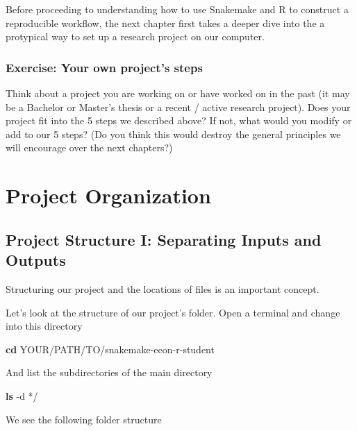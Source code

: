 \documentclass[]{book}
\newenvironment{Shaded}{\begin{snugshade}}{\end{snugshade}}
\newcommand{\KeywordTok}[1]{\textcolor[rgb]{0.13,0.29,0.53}{\textbf{{#1}}}}
\newcommand{\NormalTok}[1]{{#1}}
\theoremstyle{definition}
\theoremstyle{definition}
\theoremstyle{definition}
\theoremstyle{remark}
\begin{document}
Before proceeding to understanding how to use Snakemake and R to
construct a reproducible workflow, the next chapter first takes a deeper
dive into the a protypical way to set up a research project on our
computer.

\subsection*{Exercise: Your own project's
steps}\label{exercise-your-own-projects-steps}

Think about a project you are working on or have worked on in the past
(it may be a Bachelor or Master's thesis or a recent / active research
project). Does your project fit into the 5 steps we described above? If
not, what would you modify or add to our 5 steps? (Do you think this
would destroy the general principles we will encourage over the next
chapters?)

\chapter{Project Organization}\label{project-organization}

\section{Project Structure I: Separating Inputs and
Outputs}\label{project-structure-i-separating-inputs-and-outputs}

Structuring our project and the locations of files is an important
concept.

Let's look at the structure of our project's folder. Open a terminal and
change into this directory

\begin{Shaded}
\begin{Highlighting}[]
\KeywordTok{cd} \NormalTok{YOUR/PATH/TO/snakemake-econ-r-student}
\end{Highlighting}
\end{Shaded}

And list the subdirectories of the main directory

\begin{Shaded}
\begin{Highlighting}[]
\KeywordTok{ls} \NormalTok{-d */}
\end{Highlighting}
\end{Shaded}

We see the following folder structure
\end{document}
